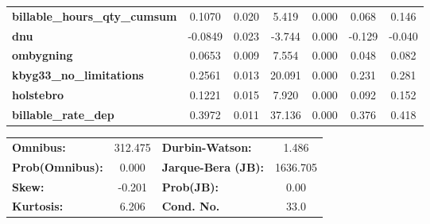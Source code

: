 \begin{center}
\begin{tabular}{lcccccc}
\textbf{billable\_hours\_qty\_cumsum}    &       0.1070  &        0.020     &     5.419  &         0.000        &        0.068    &        0.146     \\
\textbf{dnu}                             &      -0.0849  &        0.023     &    -3.744  &         0.000        &       -0.129    &       -0.040     \\
\textbf{ombygning}                       &       0.0653  &        0.009     &     7.554  &         0.000        &        0.048    &        0.082     \\
\textbf{kbyg33\_no\_limitations}         &       0.2561  &        0.013     &    20.091  &         0.000        &        0.231    &        0.281     \\
\textbf{holstebro}                       &       0.1221  &        0.015     &     7.920  &         0.000        &        0.092    &        0.152     \\
\textbf{billable\_rate\_dep}             &       0.3972  &        0.011     &    37.136  &         0.000        &        0.376    &        0.418     \\
\bottomrule
\end{tabular}
\begin{tabular}{lclc}
\textbf{Omnibus:}       & 312.475 & \textbf{  Durbin-Watson:     } &    1.486  \\
\textbf{Prob(Omnibus):} &   0.000 & \textbf{  Jarque-Bera (JB):  } & 1636.705  \\
\textbf{Skew:}          &  -0.201 & \textbf{  Prob(JB):          } &     0.00  \\
\textbf{Kurtosis:}      &   6.206 & \textbf{  Cond. No.          } &     33.0  \\
\bottomrule
\end{tabular}
\end{center}